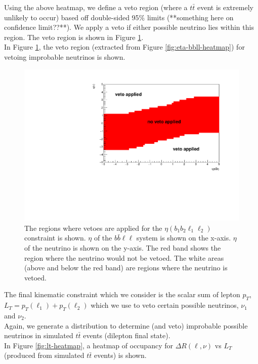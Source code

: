 Using the above heatmap, we define a veto region (where a $t\bar{t}$ event is extremely unlikely to occur) based off double-sided 95$\%$ limits (**something here on confidence limit??**). We apply a veto if either possible neutrino lies within this region. The veto region is shown in Figure \ref{fig:eta-bbll-vetoes}.\\

In Figure \ref{fig:eta-bbll-vetoes}, the veto region (extracted from Figure \ref{fig:eta-bbll-heatmap}) for vetoing improbable neutrinos is shown.

\begin{figure}[h!]
	\includegraphics[width=0.6\linewidth]{figures/bbll_veto_2vSM.pdf}
	\centering
	\caption{The regions where vetoes are applied for the $\eta(b_{1}b_{2}\ell_{1}\ell_{2})$ constraint is shown. $\eta$ of the $b\bar{b}\ell\ell$ system is shown on the x-axis. $\eta$ of the neutrino is shown on the y-axis. The red band shows the region where the neutrino would not be vetoed. The white areas (above and below the red band) are regions where the neutrino is vetoed.}
	\label{fig:eta-bbll-vetoes}
\end{figure}


The final kinematic constraint which we consider is the scalar sum of lepton $p_{T}$, $L_{T} = p_{T}(\ell_{1}) + p_{T}(\ell_{2})$ which we use to veto certain possible neutrinos, $\nu_{1}$ and $\nu_{2}$.\\

Again, we generate a distribution to determine (and veto) improbable possible neutrinos in simulated $t\bar{t}$ events (dilepton final state).\\
In Figure \ref{fig:lt-heatmap}, a heatmap of occupancy for $\Delta R (\ell, \nu)$ vs $L_{T}$ (produced from simulated $t\bar{t}$ events) is shown. 


